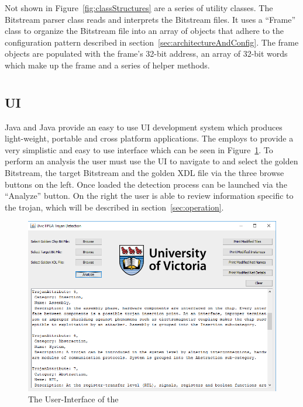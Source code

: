 Not shown in Figure~\ref{fig:classStructures} are a series of utility classes.
The \gls{Bitstream} parser class reads and interprets the \gls{Bitstream} files. 
It uses a ``Frame'' class to organize the \gls{Bitstream} file into an array of objects that adhere to the configuration pattern described in section~\ref{sec:architectureAndConfig}.
The frame objects are populated with the frame's 32-bit address, an array of 32-bit words which make up the frame and a series of helper methods.
\section{\Name}
\subsection{\acrfull{UI}}
Java and Java \Swing provide an easy to use \acrlong{UI} development system which produces light-weight, portable and cross platform applications.
The \NameNoPeriod employs \Swing to provide a very simplistic and easy to use interface which can be seen in Figure~\ref{fig:UI}.
To perform an analysis the user must use the \acrshort{UI} to navigate to and select the \gls{golden} \gls{Bitstream}, the \gls{target} \gls{Bitstream} and the \gls{golden} \acrshort{XDL} file via the three browse buttons on the left.
Once loaded the detection process can be launched via the ``Analyze'' button.
On the right the user is able to review information specific to the trojan, which will be described in section~\ref{sec:operation}.
\begin{figure}
	\centering
	\includegraphics[width=0.96\linewidth]{Figures/UI}
	\caption[The User-Interface of the \NameNoPeriod]{The User-Interface of the \NameNoPeriod}
	\label{fig:UI}
\end{figure}

